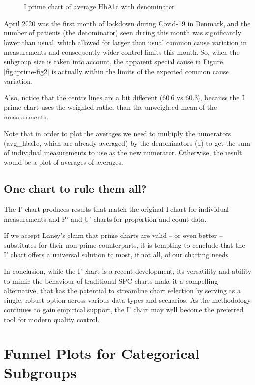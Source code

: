 \documentclass[
]{book}
\makeatletter
\newcommand*\pandocbounded[1]{%
  \sbox\pandoc@box{#1}%
  \Gscale@div\@tempa{\textheight}{\dimexpr\ht\pandoc@box+\dp\pandoc@box\relax}%
  \Gscale@div\@tempb{\linewidth}{\wd\pandoc@box}%
  \ifdim\@tempb\p@<\@tempa\p@\let\@tempa\@tempb\fi%
  \ifdim\@tempa\p@<\p@\scalebox{\@tempa}{\usebox\pandoc@box}%
  \else\usebox{\pandoc@box}%
  \fi%
}
\makeatother
\begin{document}
\begin{figure}
\centering
\pandocbounded{}
\caption{\label{fig:iprime-fig3}I prime chart of average HbA1c with denominator}
\end{figure}

April 2020 was the first month of lockdown during Covid-19 in Denmark, and the number of patients (the denominator) seen during this month was significantly lower than usual, which allowed for larger than usual common cause variation in measurements and consequently wider control limits this month. So, when the subgroup size is taken into account, the apparent special cause in Figure \ref{fig:iprime-fig2} is actually within the limits of the expected common cause variation.

Also, notice that the centre lines are a bit different (60.6 vs 60.3), because the I prime chart uses the weighted rather than the unweighted mean of the measurements.

Note that in order to plot the averages we need to multiply the numerators (avg\_hba1c, which are already averaged) by the denominators (n) to get the sum of individual measurements to use as the new numerator. Otherwise, the result would be a plot of averages of averages.

\section{One chart to rule them all?}\label{one-chart-to-rule-them-all}

The I' chart produces results that match the original I chart for individual measurements and P' and U' charts for proportion and count data.

If we accept Laney's claim that prime charts are valid -- or even better -- substitutes for their non-prime counterparts, it is tempting to conclude that the I' chart offers a universal solution to most, if not all, of our charting needs.

In conclusion, while the I' chart is a recent development, its versatility and ability to mimic the behaviour of traditional SPC charts make it a compelling alternative, that has the potential to streamline chart selection by serving as a single, robust option across various data types and scenarios. As the methodology continues to gain empirical support, the I' chart may well become the preferred tool for modern quality control.

\chapter{Funnel Plots for Categorical Subgroups}\label{funnel-plots-for-categorical-subgroups}
\end{document}
